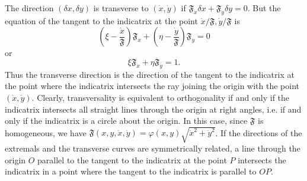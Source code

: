 The direction $(\delta x,\delta y)$ is transverse to $(\dot x,\dot y)$ if $\mathfrak F_{\dot x}\delta x+\mathfrak F_{\dot y}\delta y=0$. But the equation of the tangent to the indicatrix at the point $\dot x/\mathfrak F,\dot y/\mathfrak F$ is
\[
\left(\xi-\frac{\dot x}{\mathfrak F}\right)\mathfrak F_{\dot x}
+\left(\eta-\frac{\dot y}{\mathfrak F}\right)\mathfrak F_{\dot y}=0
\]
or
\[
\xi\mathfrak F_{\dot x}+\eta\mathfrak F_{\dot y}=1.
\]
Thus the transverse direction is the direction of the tangent to the indicatrix at the point where the indicatrix intersects the ray joining the origin with the point $(\dot x,\dot y)$. Clearly, transversality is equivalent to orthogonality if and only if the indicatrix intersects all straight lines through the origin at right angles, i.e. if and only if the indicatrix is a circle about the origin. In this case, since $\mathfrak F$ is homogeneous, we have $\mathfrak F(x,y,\dot x,\dot y)=\varphi(x,y)\sqrt{\dot x^2+\dot y^2}$. If the directions of the extremals and the transverse curves are symmetrically related, a line through the origin $O$ parallel to the tangent to the indicatrix at the point $P$ intersects the indicatrix in a point where the tangent to the indicatrix is parallel to $OP$.

